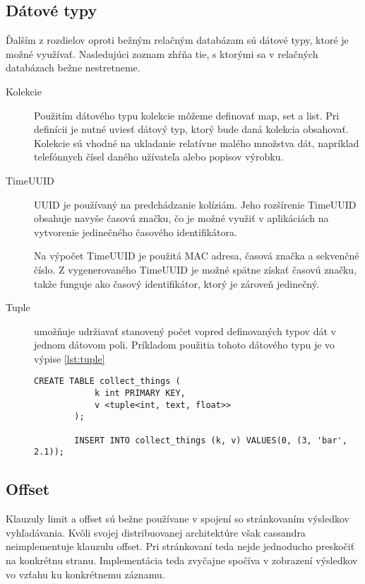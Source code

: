 	\subsection{Dátové typy}
	Ďalším z rozdielov oproti bežným relačným databázam sú dátové typy, ktoré je možné využívať. Nasledujúci zoznam zhŕňa tie, s ktorými sa v relačných databázach bežne nestretneme.
	\begin{description}
		\item[Kolekcie] Použitím dátového typu kolekcie môžeme definovať map, set a list. Pri definícii je nutné uviesť dátový typ, ktorý bude daná kolekcia obsahovať. Kolekcie sú vhodné na ukladanie relatívne malého množstva dát, napríklad telefónnych čísel daného užívateľa alebo popisov výrobku. 

		\item[TimeUUID] UUID je používaný na predchádzanie kolíziám. Jeho rozšírenie TimeUUID obsahuje navyše časovú značku, čo je možné využiť v aplikáciách na vytvorenie jedinečného časového identifikátora.
		
		Na výpočet TimeUUID je použitá MAC adresa, časová značka a sekvenčné číslo. Z vygenerovaného TimeUUID je možné spätne získať časovú značku, takže funguje ako časový identifikátor, ktorý je zároveň jedinečný.
		
		\item[Tuple] umožňuje udržiavať stanovený počet vopred definovaných typov dát v jednom dátovom poli. Príkladom použitia tohoto dátového typu je vo výpise \ref{lst:tuple}

		\begin{lstlisting}[label=lst:tuple,caption=Príklad použitia dátového typu tuple]
		CREATE TABLE collect_things (
			k int PRIMARY KEY,
			v <tuple<int, text, float>>
		);
		
		INSERT INTO collect_things (k, v) VALUES(0, (3, 'bar', 2.1));
		\end{lstlisting}
	\end{description}
	
	\subsection{Offset}
	Klauzuly limit a offset sú bežne používane v spojení so stránkovaním výsledkov vyhľadávania. Kvôli svojej distribuovanej architektúre však cassandra neimplementuje klauzulu offset. Pri stránkovaní teda nejde jednoducho preskočiť na konkrétnu stranu. Implementácia teda zvyčajne spočíva v zobrazení výsledkov vo vzťahu ku konkrétnemu záznamu.

